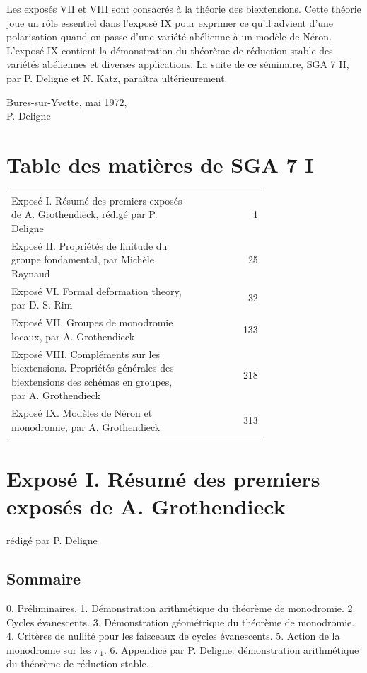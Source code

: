 \documentclass[11pt]{article}
\begin{document}
Les exposés VII et VIII sont consacrés à la théorie des biextensions. Cette théorie joue un rôle essentiel dans l'exposé IX pour exprimer ce qu'il advient d'une polarisation quand on passe d'une variété abélienne à un modèle de Néron. L'exposé IX contient la démonstration du théorème de réduction stable des variétés abéliennes et diverses applications. La suite de ce séminaire, SGA 7 II, par P. Deligne et N. Katz, paraîtra ultérieurement.

\begin{flushright}
Bures-sur-Yvette, mai 1972,\\
P. Deligne
\end{flushright}

\section*{Table des matières de SGA 7 I}
\begin{longtable}{@{}p{0.72\linewidth}r@{}}
Exposé I. Résumé des premiers exposés de A. Grothendieck, rédigé par P. Deligne & 1\\
Exposé II. Propriétés de finitude du groupe fondamental, par Michèle Raynaud & 25\\
Exposé VI. Formal deformation theory, par D. S. Rim & 32\\
Exposé VII. Groupes de monodromie locaux, par A. Grothendieck & 133\\
Exposé VIII. Compléments sur les biextensions. Propriétés générales des biextensions des schémas en groupes, par A. Grothendieck & 218\\
Exposé IX. Modèles de Néron et monodromie, par A. Grothendieck & 313
\end{longtable}

\section*{Exposé I. Résumé des premiers exposés de A. Grothendieck}
\begin{center}
rédigé par P. Deligne
\end{center}

\subsection*{Sommaire}
0. Préliminaires. 1. Démonstration arithmétique du théorème de monodromie. 2. Cycles évanescents. 3. Démonstration géométrique du théorème de monodromie. 4. Critères de nullité pour les faisceaux de cycles évanescents. 5. Action de la monodromie sur les $\pi_1$. 6. Appendice par P. Deligne: démonstration arithmétique du théorème de réduction stable.
\end{document}
